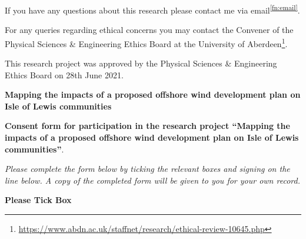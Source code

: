 {If you have any questions about this research please contact me via email\textsuperscript{\ref{fn:email}}.

For any queries regarding ethical concerns you may contact the Convener of the
Physical Sciences \& Engineering Ethics Board at the University of Aberdeen\footnote{\url{https://www.abdn.ac.uk/staffnet/research/ethical-review-10645.php}}.

\vspace{20pt}
This research project was approved by the Physical Sciences \& Engineering
Ethics Board on 28th June 2021.

\newpage

\begin{center}
  \Large
  \textbf{Mapping the impacts of a proposed offshore wind development plan on Isle of Lewis communities}
\end{center}

\vspace{24pt}
\textbf{Consent form for participation in the research project ``Mapping the impacts of a proposed offshore wind development plan on Isle of Lewis communities''}.

\textit{Please complete the form below by ticking the relevant boxes and signing on the line below. A copy of the completed form will be given to you for your own record.}

\vspace{24pt}
\textbf{Please Tick Box}

}
